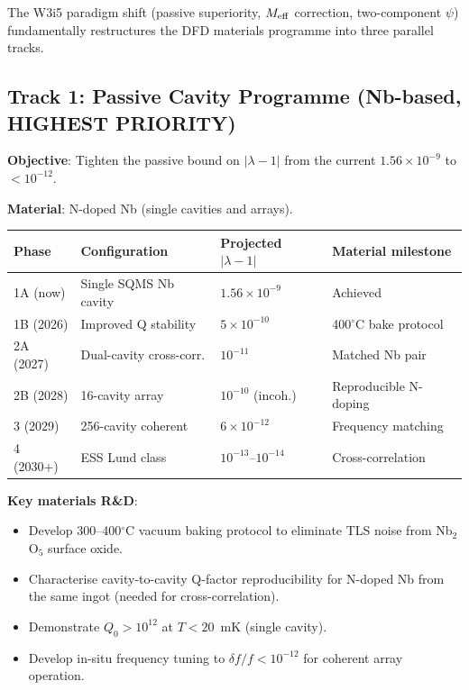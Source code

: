 \documentclass[11pt]{article}
\theoremstyle{definition}
\theoremstyle{remark}
\newcommand{\ee}[1]{\times 10^{#1}}
\newcommand{\Meff}{M_{\rm eff}}
\newcommand{\lambdabound}{1.56\ee{-9}}
\newcommand{\lam}{|\lambda-1|}
\begin{document}
The W3i5 paradigm shift (passive superiority, $\Meff$ correction,
two-component $\psi$) fundamentally restructures the DFD materials
programme into three parallel tracks.

\subsection{Track 1: Passive Cavity Programme (Nb-based, HIGHEST PRIORITY)}

\textbf{Objective}: Tighten the passive bound on $\lam$ from the
current $\lambdabound$ to $<10^{-12}$.

\textbf{Material}: N-doped Nb (single cavities and arrays).

\begin{center}
\renewcommand{\arraystretch}{1.3}
\begin{tabular}{p{2cm}p{3cm}p{2.5cm}p{3cm}}
\toprule
Phase & Configuration & Projected $\lam$ & Material milestone \\
\midrule
1A (now) & Single SQMS Nb cavity & $1.56\ee{-9}$ & Achieved \\
1B (2026) & Improved Q stability & $5\ee{-10}$ & 400$^\circ$C bake protocol \\
2A (2027) & Dual-cavity cross-corr. & $10^{-11}$ & Matched Nb pair \\
2B (2028) & 16-cavity array & $10^{-10}$ (incoh.) & Reproducible N-doping \\
3 (2029) & 256-cavity coherent & $6\ee{-12}$ & Frequency matching \\
4 (2030+) & ESS Lund class & $10^{-13}$--$10^{-14}$ & Cross-correlation \\
\bottomrule
\end{tabular}
\end{center}

\textbf{Key materials R\&D}:
\begin{itemize}[nosep]
  \item Develop 300--400$^\circ$C vacuum baking protocol to eliminate TLS
    noise from Nb$_2$O$_5$ surface oxide.
  \item Characterise cavity-to-cavity Q-factor reproducibility for
    N-doped Nb from the same ingot (needed for cross-correlation).
  \item Demonstrate $Q_0 > 10^{12}$ at $T < 20$~mK (single cavity).
  \item Develop in-situ frequency tuning to $\delta f/f < 10^{-12}$ for
    coherent array operation.
\end{itemize}
\end{document}
